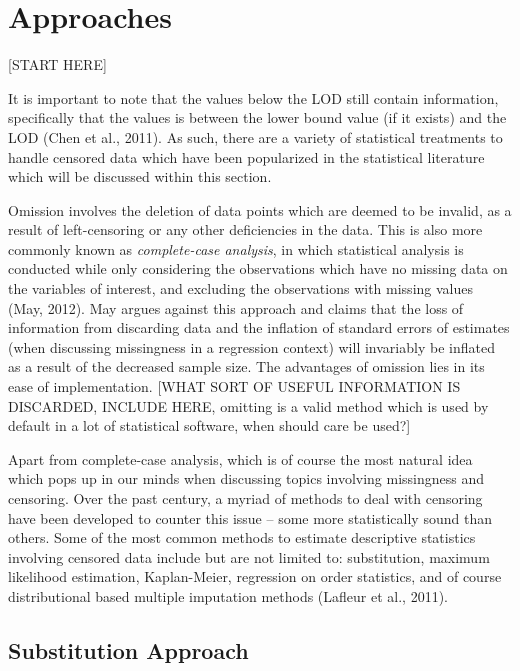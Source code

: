 \documentclass[12pt, twoside]{amherstthesis}
\begin{document}
\hypertarget{Approaches}{%
\section{Approaches}\label{Approaches}}

{[}START HERE{]}

It is important to note that the values below the LOD still contain information, specifically that the values is between the lower bound value (if it exists) and the LOD (Chen et al., 2011). As such, there are a variety of statistical treatments to handle censored data which have been popularized in the statistical literature which will be discussed within this section.

Omission involves the deletion of data points which are deemed to be invalid, as a result of left-censoring or any other deficiencies in the data. This is also more commonly known as \emph{complete-case analysis}, in which statistical analysis is conducted while only considering the observations which have no missing data on the variables of interest, and excluding the observations with missing values (May, 2012). May argues against this approach and claims that the loss of information from discarding data and the inflation of standard errors of estimates (when discussing missingness in a regression context) will invariably be inflated as a result of the decreased sample size. The advantages of omission lies in its ease of implementation. {[}WHAT SORT OF USEFUL INFORMATION IS DISCARDED, INCLUDE HERE, omitting is a valid method which is used by default in a lot of statistical software, when should care be used?{]}

Apart from complete-case analysis, which is of course the most natural idea which pops up in our minds when discussing topics involving missingness and censoring. Over the past century, a myriad of methods to deal with censoring have been developed to counter this issue -- some more statistically sound than others. Some of the most common methods to estimate descriptive statistics involving censored data include but are not limited to: substitution, maximum likelihood estimation, Kaplan-Meier, regression on order statistics, and of course distributional based multiple imputation methods (Lafleur et al., 2011).

\hypertarget{Substitution}{%
\subsection{Substitution Approach}\label{Substitution}}
\end{document}
